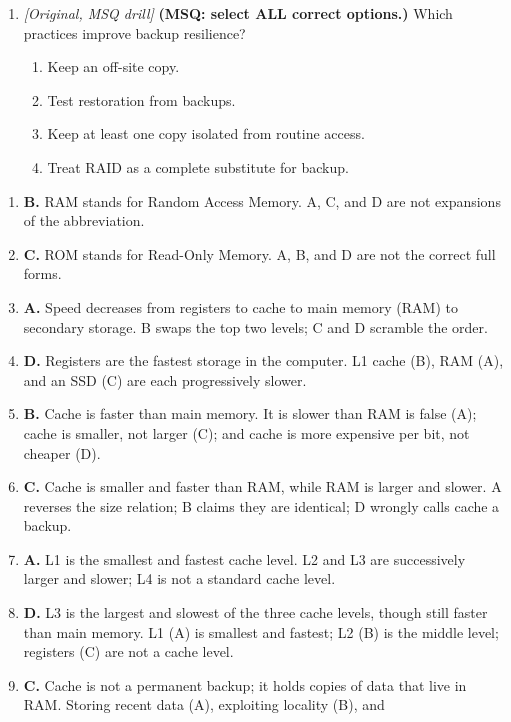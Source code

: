 \begin{enumerate}[label=\textbf{Q\arabic*.}, leftmargin=*]
\item \textit{[Original, MSQ drill]} \textbf{(MSQ: select ALL correct options.)} Which practices improve backup resilience?
  \begin{enumerate}[label=\Alph*.]
\item Keep an off-site copy.
   \item Test restoration from backups.
   \item Keep at least one copy isolated from routine access.
   \item Treat RAID as a complete substitute for backup.
  \end{enumerate}

\end{enumerate}
\begin{enumerate}[label=\textbf{Q\arabic*.}, leftmargin=*]
\item \textbf{B.} RAM stands for Random Access Memory. A, C, and D are not
  expansions of the abbreviation.
\item \textbf{C.} ROM stands for Read-Only Memory. A, B, and D are not the
  correct full forms.
\item \textbf{A.} Speed decreases from registers to cache to main memory
  (RAM) to secondary storage. B swaps the top two levels; C and D scramble
  the order.
\item \textbf{D.} Registers are the fastest storage in the computer. L1
  cache (B), RAM (A), and an SSD (C) are each progressively slower.
\item \textbf{B.} Cache is faster than main memory. It is slower than RAM is
  false (A); cache is smaller, not larger (C); and cache is more expensive
  per bit, not cheaper (D).
\item \textbf{C.} Cache is smaller and faster than RAM, while RAM is larger
  and slower. A reverses the size relation; B claims they are identical; D
  wrongly calls cache a backup.
\item \textbf{A.} L1 is the smallest and fastest cache level. L2 and L3 are
  successively larger and slower; L4 is not a standard cache level.
\item \textbf{D.} L3 is the largest and slowest of the three cache levels,
  though still faster than main memory. L1 (A) is smallest and fastest; L2
  (B) is the middle level; registers (C) are not a cache level.
\item \textbf{C.} Cache is not a permanent backup; it holds copies of data
  that live in RAM. Storing recent data (A), exploiting locality (B), and

\end{enumerate}
